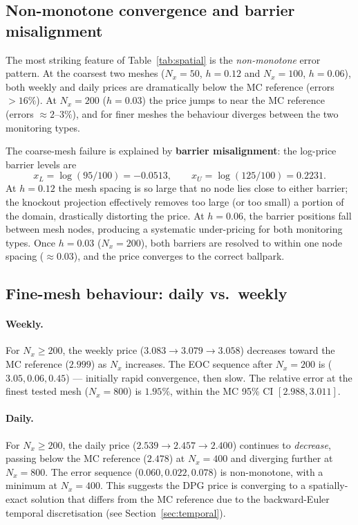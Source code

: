 \documentclass[11pt,a4paper]{article}
\newcommand{\Nx}{N_x}
\begin{document}
\subsection{Non-monotone convergence and barrier misalignment}
\label{sec:nonmono}

The most striking feature of Table~\ref{tab:spatial} is the
\emph{non-monotone} error pattern.  At the coarsest two meshes
($\Nx = 50$, $h = 0.12$ and $\Nx = 100$, $h = 0.06$), both weekly and
daily prices are dramatically below the MC reference (errors $> 16\%$).
At $\Nx = 200$ ($h = 0.03$) the price jumps to near the MC reference
(errors $\approx 2\text{--}3\%$), and for finer meshes the behaviour
diverges between the two monitoring types.

The coarse-mesh failure is explained by \textbf{barrier misalignment}:
the log-price barrier levels are
\[
  x_L = \log(95/100) = -0.0513, \qquad
  x_U = \log(125/100) = 0.2231.
\]
At $h = 0.12$ the mesh spacing is so large that no node lies close
to either barrier; the knockout projection effectively removes too large
(or too small) a portion of the domain, drastically distorting the price.
At $h = 0.06$, the barrier positions fall between mesh nodes, producing
a systematic under-pricing for both monitoring types.  Once $h = 0.03$
($\Nx = 200$), both barriers are resolved to within one node spacing
($\approx 0.03$), and the price converges to the correct ballpark.

\subsection{Fine-mesh behaviour: daily vs.\ weekly}

\paragraph{Weekly.}
For $\Nx \ge 200$, the weekly price ($3.083 \to 3.079 \to 3.058$)
decreases toward the MC reference ($2.999$) as $\Nx$ increases.
The EOC sequence after $\Nx = 200$ is ($3.05, 0.06, 0.45$) ---
initially rapid convergence, then slow.  The relative error at the
finest tested mesh ($\Nx = 800$) is $1.95\%$, within the MC
95\% CI $[2.988, 3.011]$.

\paragraph{Daily.}
For $\Nx \ge 200$, the daily price ($2.539 \to 2.457 \to 2.400$)
continues to \emph{decrease}, passing below the MC reference ($2.478$)
at $\Nx = 400$ and diverging further at $\Nx = 800$.
The error sequence ($0.060, 0.022, 0.078$) is non-monotone, with a
minimum at $\Nx = 400$.  This suggests the DPG price is converging to
a spatially-exact solution that differs from the MC reference due to
the backward-Euler temporal discretisation (see Section~\ref{sec:temporal}).
\end{document}
